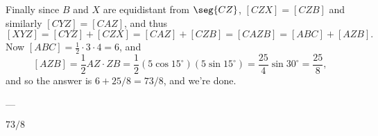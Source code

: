 Finally since $B$ and $X$ are equidistant from $\seg{CZ}$, $[CZX]=[CZB]$ and similarly $[CYZ]=[CAZ]$, and thus $$[XYZ]=[CYZ]+[CZX]=[CAZ]+[CZB]=[CAZB]=[ABC]+[AZB].$$
Now $[ABC]=\tfrac12\cdot3\cdot4=6$, and $$[AZB]=\frac12AZ\cdot ZB=\frac12(5\cos15^\circ)(5\sin15^\circ)=\frac{25}4\sin30^\circ=\frac{25}8,$$
and so the answer is $6+25/8=73/8$, and we're done.

---

$73/8$
